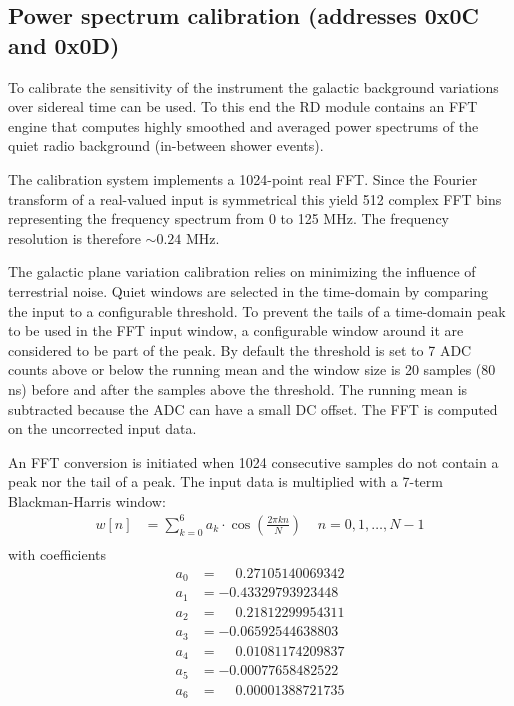 \documentclass[a4paper,indent]{paper}
\begin{document}
\subsection{Power spectrum calibration (addresses 0x0C and 0x0D)}
To calibrate the sensitivity of the instrument the galactic background variations over sidereal time can be used. To this end the RD module contains an \acs{FFT} engine that computes highly smoothed and averaged power spectrums of the quiet radio background (in-between shower events).

The calibration system implements a 1024-point real \acs{FFT}. Since the Fourier transform of a real-valued input is symmetrical this yield 512 complex \acs{FFT} bins representing the frequency spectrum from 0 to 125 MHz. The frequency resolution is therefore $\sim 0.24$ MHz. 

The galactic plane variation calibration relies on minimizing the influence of terrestrial noise. Quiet windows are selected in the time-domain by comparing the input to a configurable threshold. To prevent the tails of a time-domain peak to be used in the \acs{FFT} input window, a configurable window around it are considered to be part of the peak. By default the threshold is set to 7 ADC counts above or below the running mean and the window size is 20 samples (80 ns) before and after the samples above the threshold. The running mean is subtracted because the \acs{ADC} can have a small DC offset. The \acs{FFT} is computed on the uncorrected input data.

An \acs{FFT} conversion is initiated when 1024 consecutive samples do not contain a peak nor the tail of a peak.
The input data is multiplied with a 7-term Blackman-Harris window:
\begin{align*}
  w[n] &= \sum_{k=0}^{6}a_k \cdot \cos\left(\frac{2\pi kn}{N}\right) \;\;\;\; n=0,1,\ldots,N-1\\
\end{align*}
with coefficients
\begin{align*}
  a_0 &= \phantom{-}0.27105140069342 \\
  a_1 &= -0.43329793923448 \\
  a_2 &= \phantom{-}0.21812299954311 \\
  a_3 &= -0.06592544638803 \\
  a_4 &= \phantom{-}0.01081174209837 \\
  a_5 &= -0.00077658482522 \\
  a_6 &= \phantom{-}0.00001388721735 \\
\end{align*}
\end{document}
